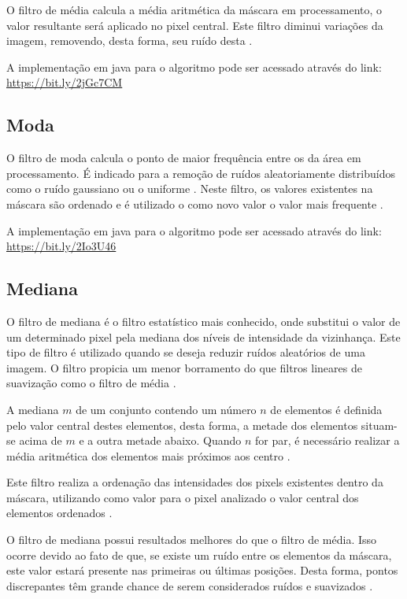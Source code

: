 \documentclass[
	12pt,				%
	oneside,			%
	a4paper,			%
	english,			%
	french,				%
	spanish,			%
	brazil,				%
	]{abntex2}
\begin{document}
O filtro de média calcula a média aritmética da máscara em processamento, o valor resultante será aplicado no pixel central. Este filtro diminui variações da imagem, removendo, desta forma, seu ruído desta \cite{gonzalesWoods:2008}.

A implementação em java para o algoritmo pode ser acessado através do link: \url{https://bit.ly/2jGc7CM} 

\subsection{Moda}
O filtro de moda calcula o ponto de maior frequência entre os da área em processamento. É indicado para a remoção de ruídos aleatoriamente distribuídos como o ruído gaussiano ou o uniforme \cite{gonzalesWoods:2008}. Neste filtro, os valores existentes na máscara são ordenado e é utilizado o como novo valor o valor mais frequente \cite{conciAzevedoLeta:2008}.

A implementação em java para o algoritmo pode ser acessado através do link: \url{https://bit.ly/2Io3U46}

\subsection{Mediana}

O filtro de mediana é o filtro estatístico mais conhecido, onde substitui o valor de um determinado pixel pela mediana dos níveis de intensidade da vizinhança. Este tipo de filtro é utilizado quando se deseja reduzir ruídos aleatórios de uma imagem. O filtro propicia um menor borramento do que filtros lineares de suavização como o filtro de média \cite{gonzalesWoods:2008}.

A mediana \(m\) de um conjunto contendo um número \(n\) de elementos é definida pelo valor central destes elementos, desta forma, a metade dos elementos situam-se acima de \(m\) e a outra metade abaixo. Quando \(n\) for par, é necessário realizar a média aritmética dos elementos mais próximos aos centro \cite{conciAzevedoLeta:2008}.

Este filtro realiza a ordenação das intensidades dos pixels existentes dentro da máscara, utilizando como valor para o pixel analizado o valor central dos elementos ordenados \cite{conciAzevedoLeta:2008}.

O filtro de mediana possui resultados melhores do que o filtro de média. Isso ocorre devido ao fato de que, se existe um ruído entre os elementos da máscara, este valor estará presente nas primeiras ou últimas posições. Desta forma, pontos discrepantes têm grande chance de serem considerados ruídos e suavizados \cite{conciAzevedoLeta:2008}.
\end{document}

